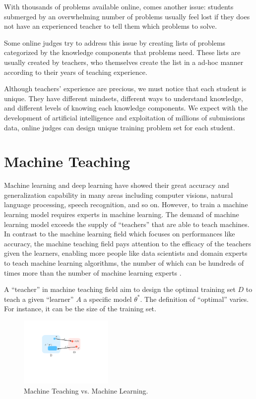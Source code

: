             With thousands of problems available online, comes another issue:
            students submerged by an overwhelming number of problems usually feel lost
            if they does not have an experienced teacher to tell them which problems to solve.

            Some online judges try to address this issue by creating lists of problems
            categorized by the knowledge components that problems need.
            These lists are usually created by teachers,
            who themselves create the list in a ad-hoc manner
            according to their years of teaching experience.

            Although teachers' experience are precious,
            we must notice that each student is unique.
            They have different mindsets, different ways to understand knowledge,
            and different levels of knowing each knowledge components.
            We expect with the development of artificial intelligence
            and exploitation of millions of submissions data,
            online judges can design unique training problem set for each student.


\section{Machine Teaching}

    Machine learning and deep learning have showed their great accuracy and generalization capability
    in many areas including computer visions, natural language processing, speech recognition, and so on.
    However, to train a machine learning model requires experts in machine learning.
    The demand of machine learning model exceeds the supply of ``teachers'' that are able to teach machines.
    In contrast to the machine learning field which focuses on performances like accuracy,
    the machine teaching field pays attention to the efficacy of the teachers given the learners,
    enabling more people like data scientists and domain experts to teach machine learning algorithms,
    the number of which can be hundreds of times more than the number of machine learning experts \cite{Simard2017}.

    A ``teacher'' in machine teaching field aim to design the optimal training set $D$
    to teach a given ``learner'' $A$ a specific model $\theta^*$.
    The definition of ``optimal'' varies.
    For instance, it can be the size of the training set.

    \begin{figure}[!htp]
        \centering
        \includegraphics[width=0.4\textwidth]{img/machine-teaching-vs-machine-learning.pdf}
        \caption{Machine Teaching vs. Machine Learning.}
        \label{fig:machine-teaching-vs-machine-learning}
    \end{figure}

